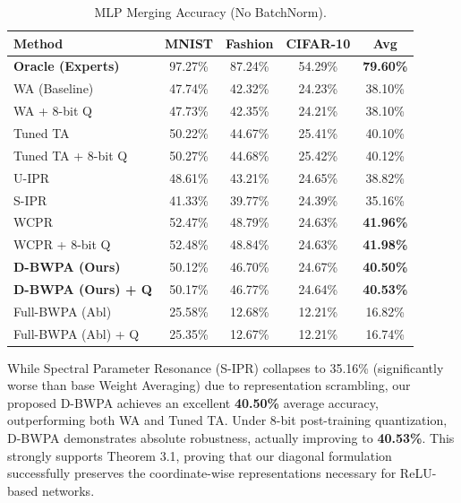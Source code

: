 \documentclass{article}
\theoremstyle{plain}
\theoremstyle{definition}
\theoremstyle{remark}
\begin{document}
\begin{table}[h]
\caption{MLP Merging Accuracy (No BatchNorm).}
\label{tab:mlp}
\vskip 0.05in
\begin{center}
\begin{footnotesize}
\begin{sc}
\setlength{\tabcolsep}{1.0pt}
\begin{tabular}{lcccc}
\toprule
Method & MNIST & Fashion & CIFAR-10 & Avg \\
\midrule
\textbf{Oracle (Experts)} & 97.27\% & 87.24\% & 54.29\% & \textbf{79.60\%} \\
\midrule
WA (Baseline) & 47.74\% & 42.32\% & 24.23\% & 38.10\% \\
WA + 8-bit Q & 47.73\% & 42.35\% & 24.21\% & 38.10\% \\
Tuned TA & 50.22\% & 44.67\% & 25.41\% & 40.10\% \\
Tuned TA + 8-bit Q & 50.27\% & 44.68\% & 25.42\% & 40.12\% \\
U-IPR & 48.61\% & 43.21\% & 24.65\% & 38.82\% \\
S-IPR & 41.33\% & 39.77\% & 24.39\% & 35.16\% \\
WCPR & 52.47\% & 48.79\% & 24.63\% & \textbf{41.96\%} \\
WCPR + 8-bit Q & 52.48\% & 48.84\% & 24.63\% & \textbf{41.98\%} \\
\midrule
\textbf{D-BWPA (Ours)} & 50.12\% & 46.70\% & 24.67\% & \textbf{40.50\%} \\
\textbf{D-BWPA (Ours) + Q} & 50.17\% & 46.77\% & 24.64\% & \textbf{40.53\%} \\
\midrule
Full-BWPA (Abl) & 25.58\% & 12.68\% & 12.21\% & 16.82\% \\
Full-BWPA (Abl) + Q & 25.35\% & 12.67\% & 12.21\% & 16.74\% \\
\bottomrule
\end{tabular}
\end{sc}
\end{footnotesize}
\end{center}
\vskip -0.18in
\vspace{-5pt}
\end{table}

While Spectral Parameter Resonance (S-IPR) collapses to 35.16\% (significantly worse than base Weight Averaging) due to representation scrambling, our proposed D-BWPA achieves an excellent \textbf{40.50\%} average accuracy, outperforming both WA and Tuned TA. Under 8-bit post-training quantization, D-BWPA demonstrates absolute robustness, actually improving to \textbf{40.53\%}. This strongly supports Theorem 3.1, proving that our diagonal formulation successfully preserves the coordinate-wise representations necessary for ReLU-based networks.
\end{document}
